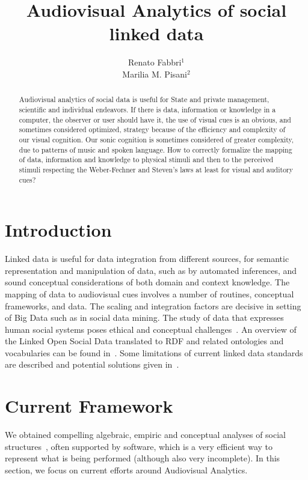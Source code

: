 \documentclass[letterpaper,10pt]{article}
\begin{document}
\title{Audiovisual Analytics of social linked data}

\author{Renato Fabbri$^1$\\
	Marilia M. Pisani$^2$
}
\address{$^1$IFSC/USP, $^2$CCNH/UFABC}

\begin{abstract}
	Audiovisual analytics of social data is useful for State and private
	management, scientific and individual endeavors.
	If there is data, information or knowledge in a computer,
	the observer or user should have it, the use of visual cues is an obvious,
	and sometimes considered optimized, strategy because of the efficiency and
	complexity of our visual cognition.
	Our sonic cognition is sometimes considered of greater complexity,
	due to patterns of music and spoken language.
	How to correctly formalize the mapping of data, information
	and knowledge to physical stimuli
	and then to the perceived stimuli
	respecting the Weber-Fechner and Steven's laws at least for visual
	and auditory cues?
\end{abstract}

\section{Introduction}
Linked data is useful for data integration from different sources,
for semantic representation and manipulation of data,
such as by automated inferences,
and sound conceptual considerations of both domain and context
knowledge.
The mapping of data to audiovisual cues
involves a number of routines, conceptual frameworks,
and data.
The scaling and integration factors are decisive in setting
of Big Data such as in social data mining.
The study of data that expresses human social systems
poses ethical and conceptual challenges~\cite{an,an2}.
An overview of the Linked Open Social Data translated to
RDF and related ontologies and vocabularies
can be found in~\cite{nuvem1,tese,losd}.
Some limitations of current linked data standards
are described and potential solutions given in~\cite{ont}.

\section{Current Framework}\label{current}
We obtained compelling algebraic, empiric and conceptual
analyses of social structures~\cite{tese,stab},
often supported by software, which is a very efficient
way to represent
what is being performed (although also very incomplete).
In this section, we focus on current efforts around Audiovisual Analytics.
\end{document}
